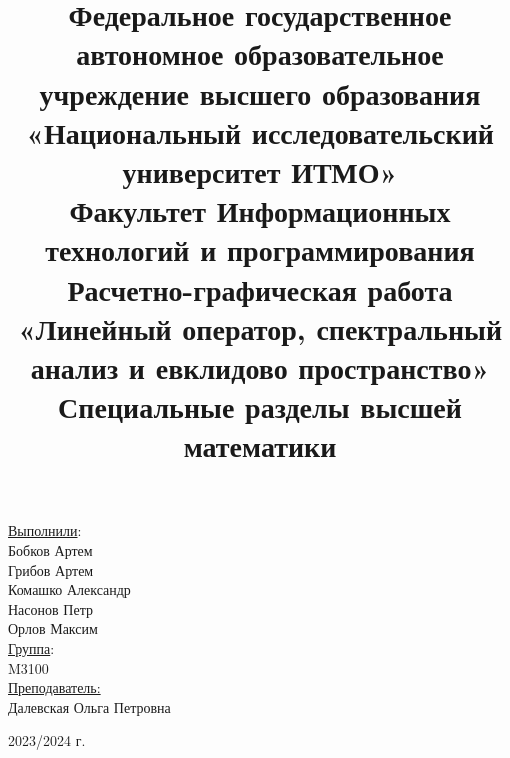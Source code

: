 \title{Федеральное государственное автономное образовательное учреждение высшего образования\\
«Национальный исследовательский университет ИТМО»\\
Факультет Информационных технологий и программирования\\[2\baselineskip]
Расчетно-графическая работа\\
\textbf{«Линейный оператор, спектральный анализ и евклидово пространство»}\\
Специальные разделы высшей математики\\
}
\date{}
\author{}

\maketitle

\thispagestyle{empty}
\vfill
\begin{flushright}
  \begin{large}
\underline{Выполнили}:\\
Бобков Артем\\
Грибов Артем\\
Комашко Александр\\
Насонов Петр\\
Орлов Максим\\[1\baselineskip]

\underline{Группа}:\\
M3100 \Cat \\[1\baselineskip]
\underline{Преподаватель:}\\
Далевская Ольга Петровна\\[3\baselineskip]

\end{large}

\end{flushright}
\begin{center} \begin{normalsize} 2023/2024 г. \\\end{normalsize} \end{center}

\clearpage

\pagestyle{plain}
